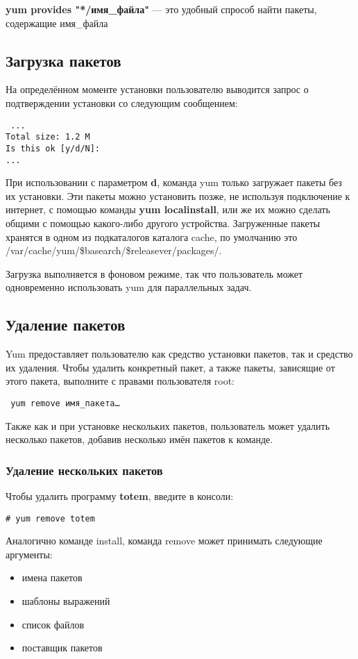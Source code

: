 \documentclass[a4paper,10pt,twoside]{article}
\begin{document}
\textbf{yum provides "*/имя\_файла"} — это удобный спрособ найти пакеты, содержащие имя\_файла

\subsection{Загрузка пакетов}
На определённом моменте установки пользователю выводится запрос о подтверждении установки со следующим сообщением:
\begin{verbatim}
 ...
Total size: 1.2 M
Is this ok [y/d/N]:    
...
\end{verbatim} 
При использовании с параметром \textbf{d}, команда yum только загружает пакеты без их установки. Эти пакеты можно установить позже, не используя подключение к интернет, с помощью команды \textbf{yum localinstall}, или же их можно сделать общими с помощью какого-либо другого устройства. Загруженные пакеты хранятся в одном из подкаталогов каталога cache, по умолчанию это ⁠/var/cache/yum/\$basearch/\$releasever/packages/. 

Загрузка выполняется в фоновом режиме, так что пользователь может одновременно использовать yum для параллельных задач.

\subsection{Удаление пакетов}
Yum предоставляет пользователю как средство установки пакетов, так и средство их удаления. Чтобы удалить конкретный пакет, а также пакеты, зависящие от этого пакета, выполните с правами пользователя root: 
\begin{verbatim}
 yum remove имя_пакета…
\end{verbatim} 
Также как и при установке нескольких пакетов, пользователь может удалить несколько пакетов, добавив несколько имён пакетов к команде.
⁠
\subsubsection{Удаление нескольких пакетов}
Чтобы удалить программу \textbf{totem}, введите в консоли:
\begin{verbatim}
# yum remove totem
\end{verbatim} 
Аналогично команде install, команда remove может принимать следующие аргументы:

\begin{itemize}
\item имена пакетов
\item шаблоны выражений
\item список файлов
\item поставщик пакетов
\end{itemize}
\end{document}

